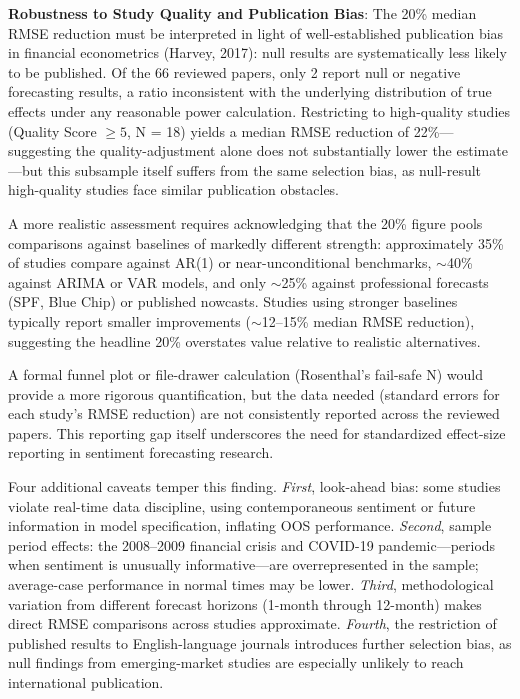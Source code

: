 \documentclass[11pt]{article}
\begin{document}
\textbf{Robustness to Study Quality and Publication Bias}: The 20\% median RMSE reduction must be interpreted in light of well-established publication bias in financial econometrics (Harvey, 2017): null results are systematically less likely to be published. Of the 66 reviewed papers, only 2 report null or negative forecasting results, a ratio inconsistent with the underlying distribution of true effects under any reasonable power calculation. Restricting to high-quality studies (Quality Score $\geq 5$, N = 18) yields a median RMSE reduction of 22\%---suggesting the quality-adjustment alone does not substantially lower the estimate---but this subsample itself suffers from the same selection bias, as null-result high-quality studies face similar publication obstacles.

A more realistic assessment requires acknowledging that the 20\% figure pools comparisons against baselines of markedly different strength: approximately 35\% of studies compare against AR(1) or near-unconditional benchmarks, $\sim$40\% against ARIMA or VAR models, and only $\sim$25\% against professional forecasts (SPF, Blue Chip) or published nowcasts. Studies using stronger baselines typically report smaller improvements ($\sim$12--15\% median RMSE reduction), suggesting the headline 20\% overstates value relative to realistic alternatives.

A formal funnel plot or file-drawer calculation (Rosenthal's fail-safe N) would provide a more rigorous quantification, but the data needed (standard errors for each study's RMSE reduction) are not consistently reported across the reviewed papers. This reporting gap itself underscores the need for standardized effect-size reporting in sentiment forecasting research.

Four additional caveats temper this finding. \emph{First}, look-ahead bias: some studies violate real-time data discipline, using contemporaneous sentiment or future information in model specification, inflating OOS performance. \emph{Second}, sample period effects: the 2008--2009 financial crisis and COVID-19 pandemic---periods when sentiment is unusually informative---are overrepresented in the sample; average-case performance in normal times may be lower. \emph{Third}, methodological variation from different forecast horizons (1-month through 12-month) makes direct RMSE comparisons across studies approximate. \emph{Fourth}, the restriction of published results to English-language journals introduces further selection bias, as null findings from emerging-market studies are especially unlikely to reach international publication.
\end{document}
